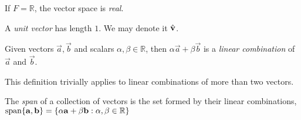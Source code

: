\documentclass[12pt]{article}
\begin{document}
If $F = \mathbb{R}$, the vector space is \emph{real}.



\begin{center}
\end{center}



\begin{definition}
    A \emph{unit vector} has length $1$.
    We may denote it $\hat{\mathbf{v}}$.
\end{definition}

\begin{definition}
    Given vectors $\vec a, \vec b$ and scalars $\alpha ,\beta \in \mathbb{R}$,
    then $\alpha \vec a + \beta \vec b$ is a \emph{linear combination} of $\vec a$ and $\vec b$.
\end{definition}

This definition trivially applies to linear combinations of more than two vectors.

\begin{definition}
    The \emph{span} of a collection of vectors
    is the set formed by their linear combinations,
    $\operatorname{span}\{\mathbf{a}, \mathbf{b}\}=\{\alpha \mathbf{a} + \beta \mathbf{b} : \alpha,\beta \in \mathbb{R}\}$
\end{definition}
\end{document}

